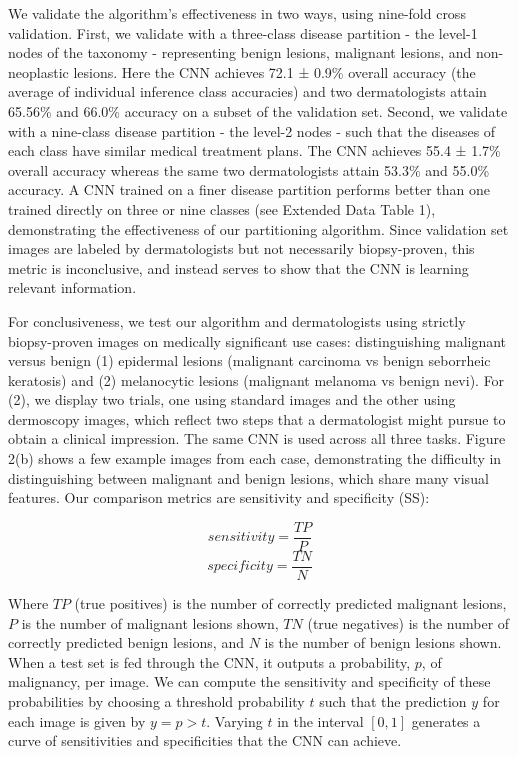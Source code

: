 We validate the algorithm’s effectiveness in two ways, using nine-fold cross validation. First, we validate with a three-class disease partition - the level-1 nodes of the taxonomy - representing benign lesions, malignant lesions, and non-neoplastic lesions. Here the CNN achieves 72.1 ± 0.9\% overall accuracy (the average of individual inference class accuracies) and two dermatologists attain 65.56\% and 66.0\% accuracy on a subset of the validation set. Second, we validate with a nine-class disease partition - the level-2 nodes - such that the diseases of each class have similar medical treatment plans. The CNN achieves 55.4 ± 1.7\% overall accuracy whereas the same two dermatologists attain 53.3\% and 55.0\% accuracy. A CNN trained on a finer disease partition performs better than one trained directly on three or nine classes (see Extended Data Table 1), demonstrating the effectiveness of our partitioning algorithm. Since validation set images are labeled by dermatologists but not necessarily biopsy-proven, this metric is inconclusive, and instead serves to show that the CNN is learning relevant information.

For conclusiveness, we test our algorithm and dermatologists using strictly biopsy-proven images on medically significant use cases: distinguishing malignant versus benign (1) epidermal lesions (malignant carcinoma vs benign seborrheic keratosis) and (2) melanocytic lesions (malignant melanoma vs benign nevi). For (2), we display two trials, one using standard images and the other using dermoscopy images, which reflect two steps that a dermatologist might pursue to obtain a clinical impression. The same CNN is used across all three tasks. Figure 2(b) shows a few example images from each case, demonstrating the difficulty in distinguishing between malignant and benign lesions, which share many visual features. Our comparison metrics are sensitivity and specificity (SS):

$$sensitivity = \frac{TP}{P}$$
$$specificity = \frac{TN}{N}$$

Where $TP$ (true positives) is the number of correctly predicted malignant lesions, $P$ is the number of malignant lesions shown, $TN$ (true negatives) is the number of correctly predicted benign lesions, and $N$ is the number of benign lesions shown. When a test set is fed through the CNN, it outputs a probability, $p$, of malignancy, per image. We can compute the sensitivity and specificity of these probabilities by choosing a threshold probability $t$ such that the prediction $y$ for each image is given by $y = p > t$. Varying $t$ in the interval $[0,1]$ generates a curve of sensitivities and specificities that the CNN can achieve.


